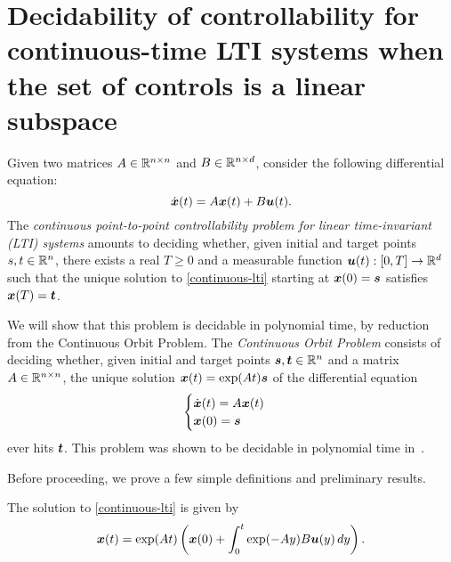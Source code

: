 \section{Decidability of controllability for continuous-time LTI systems when the set of controls is a linear subspace}

\label{continuous-decidability}

Given two matrices $A \in \mathbb{R}^{n \times n}$ and $B \in \mathbb{R}^{n \times d}$, consider the following differential equation:
\begin{equation}
\label{continuous-lti}
\dot{\myvector{x}}(t) = A \myvector{x}(t) + B \myvector{u}(t) .
\end{equation}
The \emph{continuous point-to-point controllability problem for linear time-invariant (LTI) systems} amounts to deciding whether, given initial and target points $s,t \in \mathbb{R}^{n}$, there exists a real $T\geq 0$ and a measurable function $\boldsymbol{u}(t) : [0,T] \rightarrow \mathbb{R}^{d}$ such that the unique solution to \cref{continuous-lti} starting at $\boldsymbol{x}(0) = \boldsymbol{s}$ satisfies $\boldsymbol{x}(T) = \boldsymbol{t}$.

We will show that this problem is decidable in polynomial time, by reduction from the Continuous Orbit Problem. The \emph{Continuous Orbit Problem} consists of deciding whether, given initial and target points $\boldsymbol{s}, \boldsymbol{t} \in \mathbb{R}^{n}$ and a matrix $A \in \mathbb{R}^{n \times n}$, the unique solution $\boldsymbol{x}(t) = \exp(A t) \boldsymbol{s}$ of the differential equation
\begin{equation}
\begin{cases}
\dot{\boldsymbol{x}}(t) = A \boldsymbol{x}(t) \\
\boldsymbol{x}(0) = \boldsymbol{s}
\end{cases}
\end{equation}
ever hits $\boldsymbol{t}$. This problem was shown to be decidable in polynomial time in~\cite{ContinuousSkolem1, ContinuousSkolem2}.

Before proceeding, we prove a few simple definitions and preliminary results.

\begin{lemma}
\label{closed-form-solution}
The solution to \cref{continuous-lti} is given by
\begin{equation*}
\boldsymbol{x}(t) = \exp(At) \left( \boldsymbol{x}(0) + \int_{0}^{t} \exp(-Ay) B \boldsymbol{u}(y) \, dy \right).
\end{equation*}
\end{lemma}

